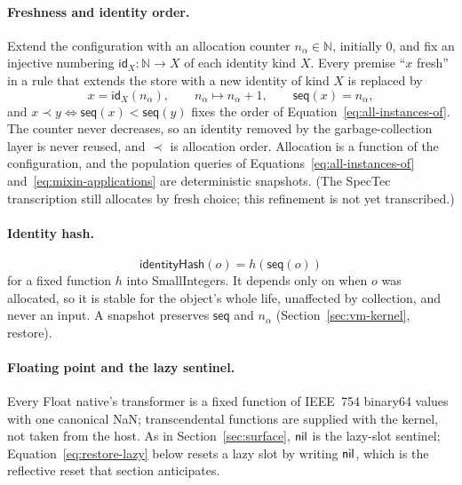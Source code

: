 \paragraph{Freshness and identity order.}
Extend the configuration with an allocation counter $n_\alpha\in\mathbb N$,
initially $0$, and fix an injective numbering $\mathsf{id}_X:\mathbb N\to X$
of each identity kind $X$.  Every premise ``$x$ fresh'' in a rule that
extends the store with a new identity of kind $X$ is replaced by
\begin{equation}\label{eq:kernel-fresh}
 x=\mathsf{id}_X(n_\alpha),
 \qquad n_\alpha\mapsto n_\alpha+1,
 \qquad \mathsf{seq}(x)=n_\alpha,
\end{equation}
and $x\prec y\Longleftrightarrow\mathsf{seq}(x)<\mathsf{seq}(y)$ fixes the
order of Equation~\eqref{eq:all-instances-of}.  The counter never decreases,
so an identity removed by the garbage-collection layer is never reused, and
$\prec$ is allocation order.  Allocation is a function of the configuration,
and the population queries of Equations~\eqref{eq:all-instances-of}
and~\eqref{eq:mixin-applications} are deterministic snapshots.  (The SpecTec
transcription still allocates by fresh choice; this refinement is not yet
transcribed.)

\paragraph{Identity hash.}
\begin{equation}\label{eq:kernel-identity-hash}
 \mathsf{identityHash}(o)=h(\mathsf{seq}(o))
\end{equation}
for a fixed function $h$ into SmallIntegers.  It depends only on when $o$ was
allocated, so it is stable for the object's whole life, unaffected by
collection, and never an input.  A snapshot preserves $\mathsf{seq}$ and
$n_\alpha$ (Section~\ref{sec:vm-kernel}, restore).

\paragraph{Floating point and the lazy sentinel.}
Every Float native's transformer is a fixed function of IEEE~754 binary64
values with one canonical NaN; transcendental functions are supplied with the
kernel, not taken from the host.  As in Section~\ref{sec:surface}, $\mathsf{nil}$ is
the lazy-slot sentinel; Equation~\eqref{eq:restore-lazy} below resets a lazy
slot by writing $\mathsf{nil}$, which is the reflective reset that section anticipates.

